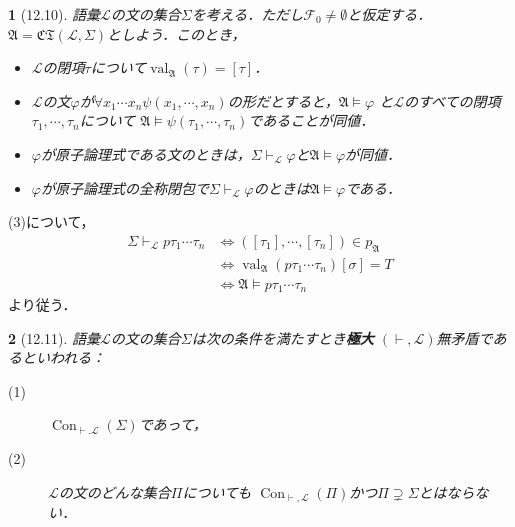 \documentclass[a4j,10.5pt,oneside,openany]{jsbook}
\theoremstyle{mystyle}
\newtheorem{thm}{\color{DarkMidnightBlue}{定理}}[section]
\newtheorem{dfn}[thm]{\color{PakistanGreen}{定義}}
\newcommand{\val}{\operatorname{val}} %
\newcommand{\Con}{\operatorname{Con}} %
\begin{document}
	\begin{screen}
		\begin{thm}[12.10]
			語彙$\mathcal{L}$の文の集合$\Sigma$を考える．ただし$\mathcal{F}_{0} \neq \emptyset$と仮定する．
			$\mathfrak{A} = \mathfrak{CT}(\mathcal{L},\Sigma)$としよう．このとき，
			\begin{itemize}
				\item[(1)] $\mathcal{L}$の閉項$\tau$について$\val_{\mathfrak{A}}(\tau)
					= [\tau]$．
				\item[(2)] $\mathcal{L}$の文$\varphi$が$\forall x_{1} \cdots x_{n}
					\psi(x_{1},\cdots,x_{n})$の形だとすると，$\mathfrak{A} \models \varphi$
					と$\mathcal{L}$のすべての閉項$\tau_{1},\cdots,\tau_{n}$について
					$\mathfrak{A} \models \psi(\tau_{1},\cdots,\tau_{n})$であることが同値．
				
				\item[(3)] $\varphi$が原子論理式である文のときは，$\Sigma \vdash_{\mathcal{L}} \varphi$と$\mathfrak{A} \models \varphi$が同値．
				\item[(4)] $\varphi$が原子論理式の全称閉包で$\Sigma \vdash_{\mathcal{L}}
					\varphi$のときは$\mathfrak{A} \models \varphi$である．
			\end{itemize}
		\end{thm}
	\end{screen}
	
	(3)について，
	\begin{align}
		\Sigma \vdash_{\mathcal{L}} p\tau_{1}\cdots\tau_{n}
		&\Longleftrightarrow ([\tau_{1}],\cdots,[\tau_{n}]) \in p_{\mathfrak{A}} \\
		&\Longleftrightarrow \val_{\mathfrak{A}}(p\tau_{1}\cdots\tau_{n})[\sigma] = T \\
		&\Longleftrightarrow \mathfrak{A} \models p\tau_{1} \cdots \tau_{n}
	\end{align}
	より従う．
	
	\begin{screen}
		\begin{dfn}[12.11]
			語彙$\mathcal{L}$の文の集合$\Sigma$は次の条件を満たすとき{\bf 極大}
			$(\vdash,\mathcal{L})$無矛盾であるといわれる：
			\begin{description}
				\item[(1)] $\Con_{\vdash.\mathcal{L}}(\Sigma)$であって，
				\item[(2)] $\mathcal{L}$の文のどんな集合$\Pi$についても
					$\Con_{\vdash,\mathcal{L}}(\Pi)$かつ$\Pi \supsetneq \Sigma$とはならない．
			\end{description}
		\end{dfn}
	\end{screen}
	
\end{document}
